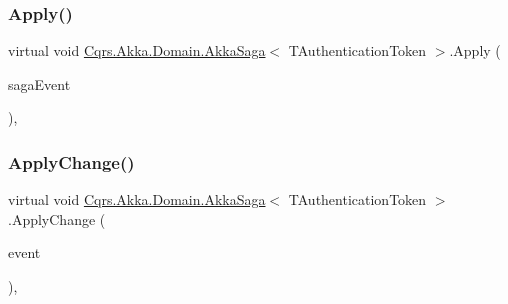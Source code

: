 \subsubsection{\texorpdfstring{Apply()}{Apply()}}
{\footnotesize\ttfamily virtual void \hyperlink{classCqrs_1_1Akka_1_1Domain_1_1AkkaSaga}{Cqrs.\+Akka.\+Domain.\+Akka\+Saga}$<$ T\+Authentication\+Token $>$.Apply (\begin{DoxyParamCaption}\item[{\hyperlink{interfaceCqrs_1_1Events_1_1ISagaEvent}{I\+Saga\+Event}$<$ T\+Authentication\+Token $>$}]{saga\+Event }\end{DoxyParamCaption})\hspace{0.3cm}{\ttfamily [protected]}, {\ttfamily [virtual]}}

\mbox{\label{classCqrs_1_1Akka_1_1Domain_1_1AkkaSaga_a42126a6a1a7896d16412b6023f208f7c}} 
\subsubsection{\texorpdfstring{Apply\+Change()}{ApplyChange()}\hspace{0.1cm}{\footnotesize\ttfamily [1/2]}}
{\footnotesize\ttfamily virtual void \hyperlink{classCqrs_1_1Akka_1_1Domain_1_1AkkaSaga}{Cqrs.\+Akka.\+Domain.\+Akka\+Saga}$<$ T\+Authentication\+Token $>$.Apply\+Change (\begin{DoxyParamCaption}\item[{\hyperlink{interfaceCqrs_1_1Events_1_1ISagaEvent}{I\+Saga\+Event}$<$ T\+Authentication\+Token $>$ @}]{event }\end{DoxyParamCaption})\hspace{0.3cm}{\ttfamily [protected]}, {\ttfamily [virtual]}}

\mbox{\label{classCqrs_1_1Akka_1_1Domain_1_1AkkaSaga_a18d554cd5ad329ab152efb7d852f2438}} 
